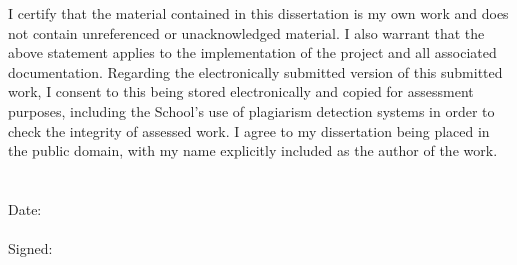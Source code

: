 \vspace*{\fill}

I certify that the material contained in this dissertation is my own work and does not contain unreferenced or unacknowledged material. I also warrant that the above statement applies to the implementation of the project and all associated documentation. Regarding the electronically submitted version of this submitted work, I consent to this being stored electronically and copied for assessment purposes, including the School’s use of plagiarism detection systems in order to check the integrity of assessed work.
I agree to my dissertation being placed in the public domain, with my name explicitly included as the author of the work.
\\\\\\
Date:
\\\\
Signed: 

\vspace*{\fill}